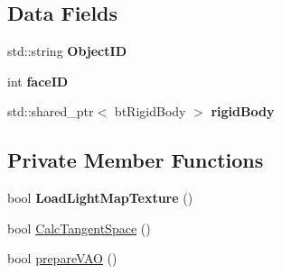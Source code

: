 \subsection*{Data Fields}
\begin{DoxyCompactItemize}
\item 
std\+::string {\bfseries Object\+ID}\hypertarget{class_b_s_p_face_a7c79a08c838144cdd0146172b6c4f6c1}{}\label{class_b_s_p_face_a7c79a08c838144cdd0146172b6c4f6c1}

\item 
int {\bfseries face\+ID}\hypertarget{class_b_s_p_face_a2f3839071b0408b173a00aa98b987e4e}{}\label{class_b_s_p_face_a2f3839071b0408b173a00aa98b987e4e}

\item 
std\+::shared\+\_\+ptr$<$ bt\+Rigid\+Body $>$ {\bfseries rigid\+Body}\hypertarget{class_b_s_p_face_af74bd1f8ab6d7510ef500bcbcc9597fb}{}\label{class_b_s_p_face_af74bd1f8ab6d7510ef500bcbcc9597fb}

\end{DoxyCompactItemize}
\subsection*{Private Member Functions}
\begin{DoxyCompactItemize}
\item 
bool {\bfseries Load\+Light\+Map\+Texture} ()\hypertarget{class_b_s_p_face_aff2c541edb2cfb6826ac8a1af5d34020}{}\label{class_b_s_p_face_aff2c541edb2cfb6826ac8a1af5d34020}

\item 
bool \hyperlink{class_b_s_p_face_a5814b00d0169b2eb7808c0d64724dd94}{Calc\+Tangent\+Space} ()
\item 
bool \hyperlink{class_b_s_p_face_a53ccd893ab6d659edb33fb09de00d7be}{prepare\+V\+AO} ()
\end{DoxyCompactItemize}
